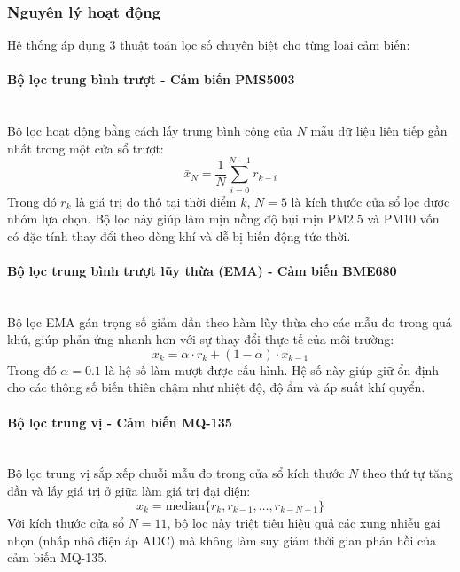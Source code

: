 \documentclass[12pt,a4paper]{article}
\begin{document}
\subsubsection{Nguyên lý hoạt động}
Hệ thống áp dụng 3 thuật toán lọc số chuyên biệt cho từng loại cảm biến:

\paragraph{Bộ lọc trung bình trượt - Cảm biến PMS5003}\mbox{}\\
Bộ lọc hoạt động bằng cách lấy trung bình cộng của $N$ mẫu dữ liệu liên tiếp gần nhất trong một cửa sổ trượt:
\[
\bar{x}_N = \frac{1}{N}\sum_{i=0}^{N-1} r_{k-i}
\]
Trong đó $r_k$ là giá trị đo thô tại thời điểm $k$, $N = 5$ là kích thước cửa sổ lọc được nhóm lựa chọn. Bộ lọc này giúp làm mịn nồng độ bụi mịn PM2.5 và PM10 vốn có đặc tính thay đổi theo dòng khí và dễ bị biến động tức thời.

\paragraph{Bộ lọc trung bình trượt lũy thừa (EMA) - Cảm biến BME680}\mbox{}\\
Bộ lọc EMA gán trọng số giảm dần theo hàm lũy thừa cho các mẫu đo trong quá khứ, giúp phản ứng nhanh hơn với sự thay đổi thực tế của môi trường:
\[
x_k = \alpha \cdot r_k + (1-\alpha) \cdot x_{k-1}
\]
Trong đó $\alpha = 0.1$ là hệ số làm mượt được cấu hình. Hệ số này giúp giữ ổn định cho các thông số biến thiên chậm như nhiệt độ, độ ẩm và áp suất khí quyển.

\paragraph{Bộ lọc trung vị - Cảm biến MQ-135}\mbox{}\\
Bộ lọc trung vị sắp xếp chuỗi mẫu đo trong cửa sổ kích thước $N$ theo thứ tự tăng dần và lấy giá trị ở giữa làm giá trị đại diện:
\[
x_k = \text{median}\{r_{k}, r_{k-1}, \dots, r_{k-N+1}\}
\]
Với kích thước cửa sổ $N = 11$, bộ lọc này triệt tiêu hiệu quả các xung nhiễu gai nhọn (nhấp nhô điện áp ADC) mà không làm suy giảm thời gian phản hồi của cảm biến MQ-135.
\end{document}
